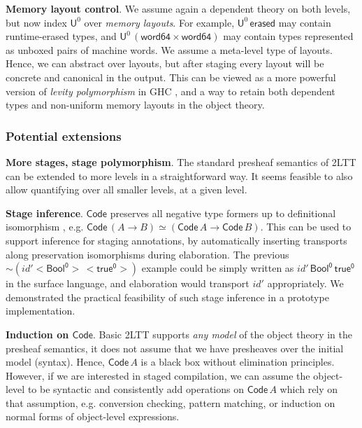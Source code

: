 \documentclass{easychair}
\newcommand{\U}{\mathsf{U}}
\newcommand{\Code}{\mathsf{Code}}
\begin{document}
\textbf{Memory layout control}. We assume again a dependent theory on both
levels, but now index $\U^0$ over \emph{memory layouts}. For example,
$\U^0\,\mathsf{erased}$ may contain runtime-erased types, and
$\U^0\,(\mathsf{word64} \times \mathsf{word64})$ may contain types represented
as unboxed pairs of machine words. We assume a meta-level type of
layouts. Hence, we can abstract over layouts, but after staging every layout
will be concrete and canonical in the output. This can be viewed as a more
powerful version of \emph{levity polymorphism} in GHC \cite{levity}, and a way
to retain both dependent types and non-uniform memory layouts in the object
theory.

\subsubsection*{Potential extensions}

\textbf{More stages, stage polymorphism}. The standard presheaf semantics of
2LTT can be extended to more levels in a straightforward way. It seems feasible
to also allow quantifying over all smaller levels, at a given level.

\textbf{Stage inference}. $\Code$ preserves all negative type formers up to
definitional isomorphism \cite{twolevel}, e.g. $\Code\,(A \to B) \simeq
(\Code\,A \to \Code\,B)$. This can be used to support inference for staging
annotations, by automatically inserting transports along preservation
isomorphisms during elaboration. The previous
$\sim\!(\mathit{id'}<\!\mathsf{Bool^0}\!>\,<\!\mathsf{true^0}\!>)$ example could
be simply written as $\mathit{id'}\,\mathsf{Bool^0}\,\mathsf{true^0}$ in the
surface language, and elaboration would transport $\mathit{id'}$ appropriately.
We demonstrated the practical feasibility of such stage inference in a prototype
implementation.

\textbf{Induction on $\Code$}. Basic 2LTT supports \emph{any model} of the
object theory in the presheaf semantics, it does not assume that we have
presheaves over the initial model (syntax). Hence, $\Code\,A$ is a black box
without elimination principles. However, if we are interested in staged
compilation, we can assume the object-level to be syntactic and consistently add
operations on $\Code\,A$ which rely on that assumption, e.g. conversion
checking, pattern matching, or induction on normal forms of object-level
expressions.



\end{document}
